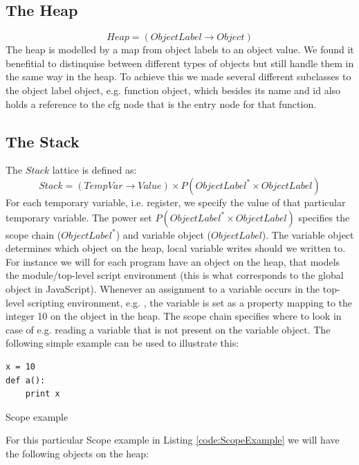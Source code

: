 \subsection{The Heap}
\begin{equation*}
Heap = (ObjectLabel \rightarrow Object)
\end{equation*}
The heap is modelled by a map from object labels to an object value. We found it benefitial to distinquise between different types of objects but still handle them in the same way in the heap.
To achieve this we made several different subclasses to the object label object, e.g. function object, which besides its name and id also holds a reference to the cfg node that is the entry node for that function.


\subsection{The Stack}
The $Stack$ lattice is defined as:
\begin{equation*}
Stack = (TempVar \rightarrow Value) \times P(ObjectLabel^{*} \times ObjectLabel)
\end{equation*}
For each temporary variable, i.e. register, we specify the value of that particular temporary variable. The power set $P(ObjectLabel^{*} \times ObjectLabel)$ specifies the scope chain ($ObjectLabel^{*}$) and variable object ($ObjectLabel$). The variable object determines which object on the heap, local variable writes should we written to. For instance we will for each program have an object on the heap, that models the module/top-level script environment \cite{pyref.main} (this is what corresponds to the global object in JavaScript). Whenever an assignment to a variable occurs in the top-level scripting environment, e.g. , the variable  is set as a property mapping to the integer 10 on the  object in the heap.
The scope chain specifies where to look in case of e.g. reading a variable that is not present on the variable object. The following simple example can be used to illustrate this:
\begin{listing}[H]
	\begin{verbatim}
x = 10 
def a():
	print x
	\end{verbatim}
\caption{Scope example}\label{code:ScopeExample}
\end{listing}
For this particular Scope example in Listing \ref{code:ScopeExample} we will have the following objects on the heap:
